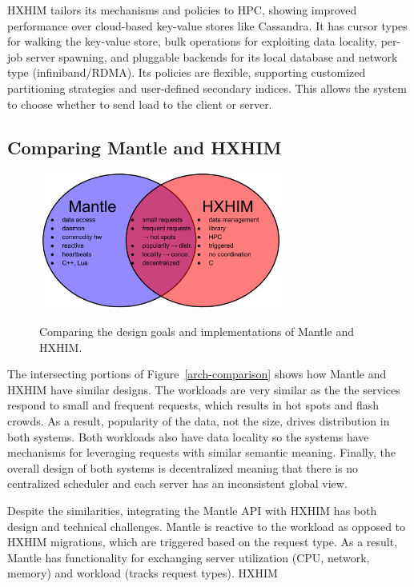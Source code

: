 HXHIM tailors its mechanisms and policies to HPC, showing improved performance
over cloud-based key-value stores like Cassandra. It has cursor types for
walking the key-value store, bulk operations for exploiting data locality,
per-job server spawning, and pluggable backends for its local database and
network type (infiniband/RDMA). Its policies are flexible, supporting
customized partitioning strategies and user-defined secondary indices. This
allows the system to choose whether to send load to the client or server.

\subsection{Comparing Mantle and HXHIM}
\begin{figure}[tb]
  \noindent\includegraphics[width=19pc,angle=0]{figures/arch-comparison.png}\\
  \caption{Comparing the design goals and implementations of Mantle and HXHIM.}
  \label{fig:arch-comparison}
\end{figure}

The intersecting portions of Figure~\ref{arch-comparison} shows how Mantle and
HXHIM have similar designs. The workloads are very similar as the the services
respond to small and frequent requests, which results in hot spots and flash
crowds. As a result, popularity of the data, not the size, drives distribution
in both systems. Both workloads also have data locality so the systems have
mechanisms for leveraging requests with similar semantic meaning. Finally, the
overall design of both systems is decentralized meaning that there is no
centralized scheduler and each server has an inconsistent global view.

Despite the similarities, integrating the Mantle API with HXHIM has both design
and technical challenges. Mantle is reactive to the workload as opposed to
HXHIM migrations, which are triggered based on the request type. As a result,
Mantle has functionality for exchanging server 
utilization (CPU, network, memory) and workload (tracks request types). HXHIM 


